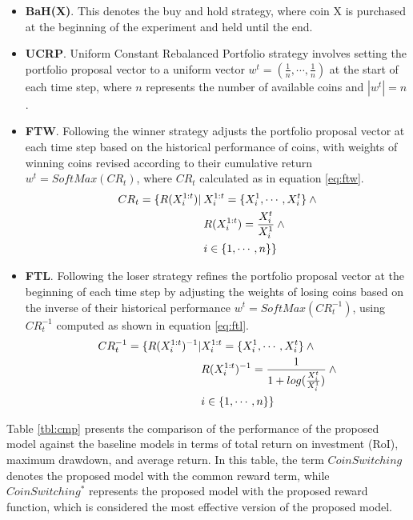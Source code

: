 \begin{itemize}
	\item \textbf{BaH(X)}. This denotes the buy and hold strategy, where coin X is purchased at the beginning of the experiment and held until the end.
	\item \textbf{UCRP}. Uniform Constant Rebalanced Portfolio strategy involves setting the portfolio proposal vector to a uniform vector $w^t=(\frac{1}{n}, \cdots, \frac{1}{n})$ at the start of each time step, where $n$ represents the number of available coins and $|w^t| = n$.	
	\item \textbf{FTW}. Following the winner strategy adjusts the portfolio proposal vector at each time step based on the historical performance of coins, with weights of winning coins revised according to their cumulative return $w^t = SoftMax(CR_t)$, where $CR_t$ calculated as in equation \eqref{eq:ftw}.
	\begin{align}
		CR_t = \{R(X_i^{1:t})| \> &X_i^{1:t} = \{X_i^1, \cdots, X_i^t\} \> \land  \notag \\ 
		&R(X_i^{1:t}) = \frac{X_i^t}{X_i^1} \> \land \notag \\ 
		&i \in \{1, \cdots, n\}\}
		\label{eq:ftw}
	\end{align}

	\item \textbf{FTL}. Following the loser strategy refines the portfolio proposal vector at the beginning of each time step by adjusting the weights of losing coins based on the inverse of their historical performance $w^t = SoftMax(CR_t^{-1})$, using $CR_t^{-1}$ computed as shown in equation \eqref{eq:ftl}.
	\begin{align}
	CR_t^{-1} = \{R(X_i^{1:t})^{-1} | &X_i^{1:t} = \{X_i^1, \cdots, X_i^t\} \> \land \notag\\ 
	&R(X_i^{1:t})^{-1} = \frac{1}{1 + log(\frac{X_i^t}{X_i^1})} \> \land \notag \\  
	&i \in \{1, \cdots, n\} \}
	\label{eq:ftl}
	\end{align}
\end{itemize}
Table \ref{tbl:cmp} presents the comparison of the performance of the proposed model against the baseline models in terms of total return on investment (RoI), maximum drawdown, and average return. In this table, the term $CoinSwitching$ denotes the proposed model with the common reward term, while $CoinSwitching^*$ represents the proposed model with the proposed reward function, which is considered the most effective version of the proposed model.

